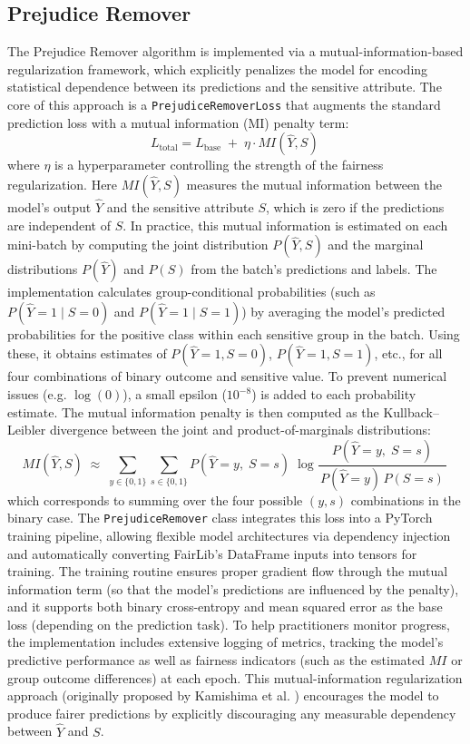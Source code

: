 \documentclass[12pt,a4paper,openright,twoside]{book}
\begin{document}
\subsection{Prejudice Remover}
The Prejudice Remover algorithm is implemented via a mutual-information-based regularization framework, which explicitly penalizes the model for encoding statistical dependence between its predictions and the sensitive attribute. The core of this approach is a \texttt{PrejudiceRemoverLoss} that augments the standard prediction loss with a mutual information (MI) penalty term:
\begin{equation}
    L_{\text{total}} = L_{\text{base}} \;+\; \eta \cdot MI(\hat{Y}, S)\,
\end{equation}
where $\eta$ is a hyperparameter controlling the strength of the fairness regularization. Here $MI(\hat{Y}, S)$ measures the mutual information between the model’s output $\hat{Y}$ and the sensitive attribute $S$, which is zero if the predictions are independent of $S$. In practice, this mutual information is estimated on each mini-batch by computing the joint distribution $P(\hat{Y}, S)$ and the marginal distributions $P(\hat{Y})$ and $P(S)$ from the batch’s predictions and labels. The implementation calculates group-conditional probabilities (such as $P(\hat{Y}=1 \mid S=0)$ and $P(\hat{Y}=1 \mid S=1)$) by averaging the model’s predicted probabilities for the positive class within each sensitive group in the batch. Using these, it obtains estimates of $P(\hat{Y}=1, S=0)$, $P(\hat{Y}=1, S=1)$, etc., for all four combinations of binary outcome and sensitive value. To prevent numerical issues (e.g. $\log(0)$), a small epsilon ($10^{-8}$) is added to each probability estimate. The mutual information penalty is then computed as the Kullback–Leibler divergence between the joint and product-of-marginals distributions:
\begin{equation}
    MI(\hat{Y}, S) \;\approx\; \sum_{y\in\{0,1\}} \sum_{s\in\{0,1\}} P(\hat{Y}=y,\;S=s)\; \log \frac{P(\hat{Y}=y,\;S=s)}{\,P(\hat{Y}=y)\,P(S=s)\,}\,
\end{equation}
which corresponds to summing over the four possible $(y, s)$ combinations in the binary case. The \texttt{PrejudiceRemover} class integrates this loss into a PyTorch training pipeline, allowing flexible model architectures via dependency injection and automatically converting FairLib’s DataFrame inputs into tensors for training. The training routine ensures proper gradient flow through the mutual information term (so that the model’s predictions are influenced by the penalty), and it supports both binary cross-entropy and mean squared error as the base loss (depending on the prediction task). To help practitioners monitor progress, the implementation includes extensive logging of metrics, tracking the model’s predictive performance as well as fairness indicators (such as the estimated $MI$ or group outcome differences) at each epoch. This mutual-information regularization approach (originally proposed by Kamishima et al. \cite{kamishima2012prejudiceremoverregularizer}) encourages the model to produce fairer predictions by explicitly discouraging any measurable dependency between $\hat{Y}$ and $S$.
\end{document}
